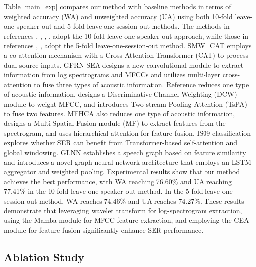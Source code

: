 \documentclass[runningheads]{llncs}
\begin{document}
Table \ref{main_exp} compares our method with baseline methods in terms of weighted accuracy (WA) and unweighted accuracy (UA) using both 10-fold leave-one-speaker-out and 5-fold leave-one-session-out methods. The methods in references \cite{b19}, \cite{b14}, \cite{b15}, \cite{b16}, \cite{b9} adopt the 10-fold leave-one-speaker-out approach, while those in references \cite{b19}, \cite{b21}, \cite{b22} adopt the 5-fold leave-one-session-out method. 
SMW\_CAT employs a co-attention mechanism with a Cross-Attention Transformer (CAT) to process dual-source inputs. GFRN-SEA designs a new convolutional module to extract information from log spectrograms and MFCCs and utilizes multi-layer cross-attention to fuse three types of acoustic information.  
Reference \cite{b15} reduces one type of acoustic information, designs a Discriminative Channel Weighting (DCW) module to weight MFCC, and introduces Two-stream Pooling Attention (TsPA) to fuse two features. MFHCA also reduces one type of acoustic information, designs a Multi-Spatial Fusion module (MF) to extract features from the spectrogram, and uses hierarchical attention for feature fusion. IS09-classification explores whether SER can benefit from Transformer-based self-attention and global windowing. GLNN establishes a speech graph based on feature similarity and introduces a novel graph neural network architecture that employs an LSTM aggregator and weighted pooling.  Experimental results show that our method achieves the best performance, with WA reaching 76.60\% and UA reaching 77.41\% in the 10-fold leave-one-speaker-out method. In the 5-fold leave-one-session-out method, WA reaches 74.46\% and UA reaches 74.27\%. These results demonstrate that leveraging wavelet transform for log-spectrogram extraction, using the Mamba module for MFCC feature extraction, and employing the CEA module for feature fusion significantly enhance SER performance.
\subsection{Ablation Study}
\end{document}
